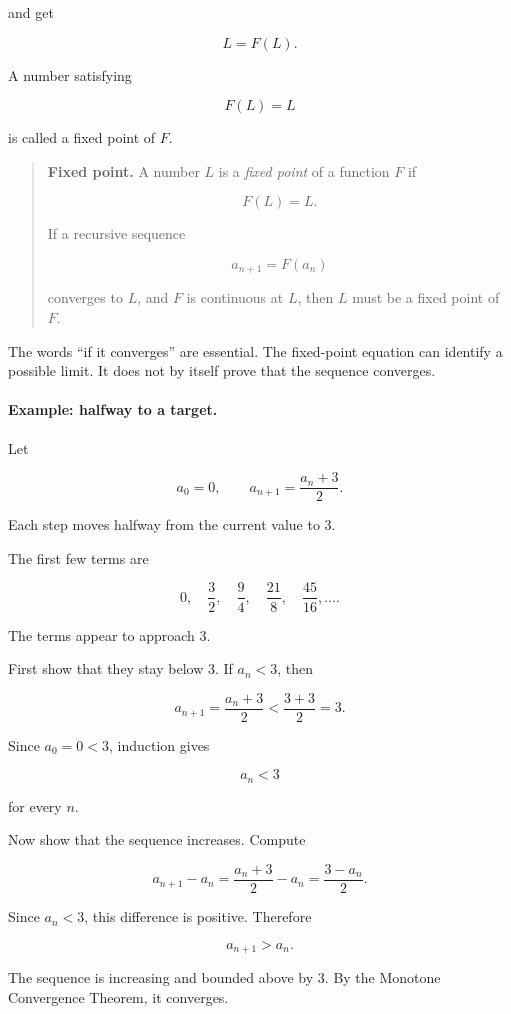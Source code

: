 and get

\[
L=F(L).
\]

A number satisfying

\[
F(L)=L
\]

is called a fixed point of \(F\).

\begin{quote}
\textbf{Fixed point.}
A number \(L\) is a \emph{fixed point} of a function \(F\) if

\[
F(L)=L.
\]

If a recursive sequence

\[
a_{n+1}=F(a_n)
\]

converges to \(L\), and \(F\) is continuous at \(L\), then \(L\) must be a fixed point of
\(F\).
\end{quote}

The words ``if it converges'' are essential.  The fixed-point equation can identify a
possible limit.  It does not by itself prove that the sequence converges.

\paragraph{Example: halfway to a target.}
Let

\[
a_0=0,
\qquad
a_{n+1}=\frac{a_n+3}{2}.
\]

Each step moves halfway from the current value to \(3\).

The first few terms are

\[
0,\quad
\frac32,\quad
\frac94,\quad
\frac{21}{8},\quad
\frac{45}{16},\ldots.
\]

The terms appear to approach \(3\).

First show that they stay below \(3\).  If \(a_n<3\), then

\[
a_{n+1}=\frac{a_n+3}{2}<\frac{3+3}{2}=3.
\]

Since \(a_0=0<3\), induction gives

\[
a_n<3
\]

for every \(n\).

Now show that the sequence increases.  Compute

\[
a_{n+1}-a_n
=
\frac{a_n+3}{2}-a_n
=
\frac{3-a_n}{2}.
\]

Since \(a_n<3\), this difference is positive.  Therefore

\[
a_{n+1}>a_n.
\]

The sequence is increasing and bounded above by \(3\).  By the Monotone Convergence
Theorem, it converges.

